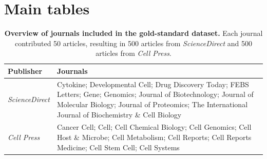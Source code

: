 \section{Main tables}

\begin{table}[H]
\centering
\caption{\textbf{Overview of journals included in the gold-standard dataset.} Each journal contributed 50 articles, resulting in 500 articles from \textit{ScienceDirect} and 500 articles from \textit{Cell Press}.}\label{tab:goldstandard}
\begin{tabularx}{\linewidth}{lX}
\toprule
\textbf{Publisher} & \textbf{Journals} \\
\midrule
\textit{ScienceDirect} & 
Cytokine; Developmental Cell; Drug Discovery Today; FEBS Letters; Gene;
Genomics; Journal of Biotechnology; Journal of Molecular Biology;
Journal of Proteomics; The International Journal of Biochemistry \& Cell Biology \\
\addlinespace[0.3em]
\textit{Cell Press} & 
Cancer Cell; Cell; Cell Chemical Biology; Cell Genomics;
Cell Host \& Microbe; Cell Metabolism; Cell Reports;
Cell Reports Medicine; Cell Stem Cell; Cell Systems \\
\bottomrule
\end{tabularx}
\end{table}

